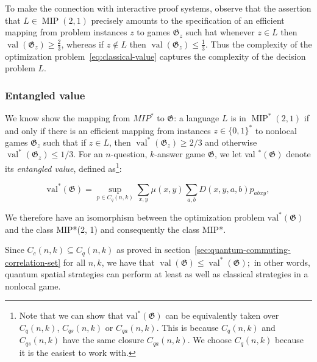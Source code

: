 To make the connection with interactive proof systems, observe that the assertion that $L \in \operatorname{MIP}(2,1)$ precisely amounts to the specification of an efficient mapping from problem instances $z$ to games $\mathfrak{G}_{z}$ such hat whenever $z \in L$ then $\operatorname{val}\left(\mathfrak{G}_{z}\right) \geq \frac{2}{3}$, whereas if $z \notin L$ then $\operatorname{val}\left(\mathfrak{G}_{z}\right) \leq \frac{1}{3}$. Thus the complexity of the optimization problem~\ref{eq:classical-value} captures the complexity of the decision problem $L$.

\subsubsection{Entangled value}\label{subsection:quantum-games}

We know show the mapping from $MIP^{*}$ to $\mathfrak{G}$: a language $L$ is in $\operatorname{MIP}^{*}(2,1)$ if and only if there is an efficient mapping from instances $z \in\{0,1\}^{*}$ to nonlocal games $\mathfrak{G}_{z}$ such that if $z \in L$, then $\operatorname{val}^{*}\left(\mathfrak{G}_{z}\right) \geq 2 / 3$ and otherwise $\operatorname{val}^{*}\left(\mathfrak{G}_{z}\right) \leq 1 / 3$.
 For an $n$-question, $k$-answer game $\mathfrak{G}$, we let val ${ }^{*}(\mathfrak{G})$ denote its \emph{entangled value}, defined as\footnote{Note that we can show that $\operatorname{val^{*}}(\mathfrak{G})$ can be equivalently taken over $C_{q}(n, k)$, $C_{q s}(n, k)$ or $C_{q a}(n, k)$. This is because $C_{q}(n, k)$ and $C_{q s}(n, k)$ have the same closure $C_{q a}(n, k)$. We choose $C_{q}(n, k)$ because it is the easiest to work with.}:

\begin{defn}\label{defn:entangled-value}
    \begin{equation}
    \operatorname{val^{*}}(\mathfrak{G})=\sup _{p \in C_{q}(n, k)} \sum_{x, y} \mu(x, y) \sum_{a, b} D(x, y, a, b) p_{a b x y},
    \end{equation}
\end{defn}


We therefore have an isomorphism between the optimization problem $\operatorname{val^{*}}(\mathfrak{G})$ and the class MIP*(2, 1) and consequently the class MIP*.


Since $C_{c}(n, k) \subseteq C_{q}(n, k)$ as proved in section~\ref{sec:quantum-commuting-correlation-set} for all $n, k$, we have that $\operatorname{val}(\mathfrak{G}) \leq \operatorname{val}^{*}(\mathfrak{G}) ;$ in other words, quantum spatial strategies can perform at least as well as classical strategies in a nonlocal game.

